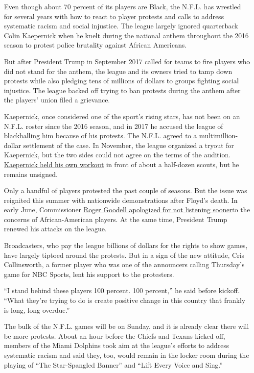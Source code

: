 Even though about 70 percent of its players are Black, the N.F.L. has
wrestled for several years with how to react to player protests and
calls to address systematic racism and social injustice. The league
largely ignored quarterback Colin Kaepernick when he knelt during the
national anthem throughout the 2016 season to protest police brutality
against African Americans.

But after President Trump in September 2017 called for teams to fire
players who did not stand for the anthem, the league and its owners
tried to tamp down protests while also pledging tens of millions of
dollars to groups fighting social injustice. The league backed off
trying to ban protests during the anthem after the players' union filed
a grievance.

Kaepernick, once considered one of the sport's rising stars, has not
been on an N.F.L. roster since the 2016 season, and in 2017 he accused
the league of blackballing him because of his protests. The N.F.L.
agreed to a multimillion-dollar settlement of the case. In November, the
league organized a tryout for Kaepernick, but the two sides could not
agree on the terms of the audition.
\href{https://www.nytimes3xbfgragh.onion/2019/11/16/sports/football/colin-kaepernick-nfl-workout.html}{Kaepernick
held his own workout} in front of about a half-dozen scouts, but he
remains unsigned.

Only a handful of players protested the past couple of seasons. But the
issue was reignited this summer with nationwide demonstrations after
Floyd's death. In early June, Commissioner
\href{https://www.nytimes3xbfgragh.onion/2020/06/05/sports/football/trump-anthem-kneeling-kaepernick.html}{Roger
Goodell apologized for not listening sooner}to the concerns of
African-American players. At the same time, President Trump renewed his
attacks on the league.

Broadcasters, who pay the league billions of dollars for the rights to
show games, have largely tiptoed around the protests. But in a sign of
the new attitude, Cris Collinsworth, a former player who was one of the
announcers calling Thursday's game for NBC Sports, lent his support to
the protesters.

``I stand behind these players 100 percent. 100 percent,'' he said
before kickoff. ``What they're trying to do is create positive change in
this country that frankly is long, long overdue.''

The bulk of the N.F.L. games will be on Sunday, and it is already clear
there will be more protests. About an hour before the Chiefs and Texans
kicked off, members of the Miami Dolphins took aim at the league's
efforts to address systematic racism and said they, too, would remain in
the locker room during the playing of ``The Star-Spangled Banner'' and
``Lift Every Voice and Sing.''

